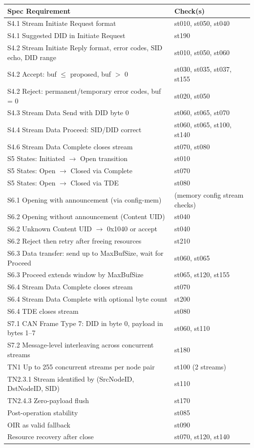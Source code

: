 \begin{tabular}{|p{8cm}|p{5cm}|}
\hline
\textbf{Spec Requirement} & \textbf{Check(s)} \\
\hline
S4.1 Stream Initiate Request format & st010, st050, st040 \\
\hline
S4.1 Suggested DID in Initiate Request & st190 \\
\hline
S4.2 Stream Initiate Reply format, error codes, SID echo, DID range & st010, st050, st060 \\
\hline
S4.2 Accept: buf $\leq$ proposed, buf $>$ 0 & st030, st035, st037, st155 \\
\hline
S4.2 Reject: permanent/temporary error codes, buf = 0 & st020, st050 \\
\hline
S4.3 Stream Data Send with DID byte 0 & st060, st065, st070 \\
\hline
S4.4 Stream Data Proceed: SID/DID correct & st060, st065, st100, st140 \\
\hline
S4.6 Stream Data Complete closes stream & st070, st080 \\
\hline
S5 States: Initiated $\rightarrow$ Open transition & st010 \\
\hline
S5 States: Open $\rightarrow$ Closed via Complete & st070 \\
\hline
S5 States: Open $\rightarrow$ Closed via TDE & st080 \\
\hline
S6.1 Opening with announcement (via config-mem) & (memory config stream checks) \\
\hline
S6.2 Opening without announcement (Content UID) & st040 \\
\hline
S6.2 Unknown Content UID $\rightarrow$ 0x1040 or accept & st040 \\
\hline
S6.2 Reject then retry after freeing resources & st210 \\
\hline
S6.3 Data transfer: send up to MaxBufSize, wait for Proceed & st060, st065 \\
\hline
S6.3 Proceed extends window by MaxBufSize & st065, st120, st155 \\
\hline
S6.4 Stream Data Complete closes stream & st070 \\
\hline
S6.4 Stream Data Complete with optional byte count & st200 \\
\hline
S6.4 TDE closes stream & st080 \\
\hline
S7.1 CAN Frame Type 7: DID in byte 0, payload in bytes 1--7 & st060, st110 \\
\hline
S7.2 Message-level interleaving across concurrent streams & st180 \\
\hline
TN1 Up to 255 concurrent streams per node pair & st100 (2 streams) \\
\hline
TN2.3.1 Stream identified by (SrcNodeID, DstNodeID, SID) & st110 \\
\hline
TN2.4.3 Zero-payload flush & st170 \\
\hline
Post-operation stability & st085 \\
\hline
OIR as valid fallback & st090 \\
\hline
Resource recovery after close & st070, st120, st140 \\
\hline
\end{tabular}

